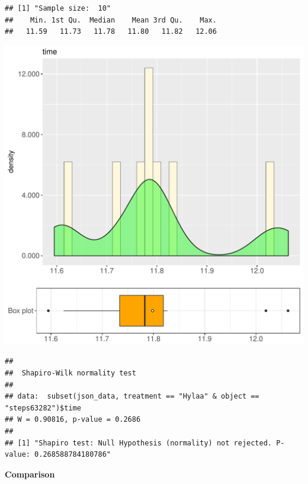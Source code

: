 \documentclass{article}\usepackage[]{graphicx}\usepackage[]{color}
\makeatletter
\def\maxwidth{ %
  \ifdim\Gin@nat@width>\linewidth
    \linewidth
  \else
    \Gin@nat@width
  \fi
}
\newenvironment{kframe}{%
 \def\at@end@of@kframe{}%
 \ifinner\ifhmode%
  \def\at@end@of@kframe{\end{minipage}}%
  \begin{minipage}{\columnwidth}%
 \fi\fi%
 \def\FrameCommand##1{\hskip\@totalleftmargin \hskip-\fboxsep
 \colorbox{shadecolor}{##1}\hskip-\fboxsep
     \hskip-\linewidth \hskip-\@totalleftmargin \hskip\columnwidth}%
 \MakeFramed {\advance\hsize-\width
   \@totalleftmargin\z@ \linewidth\hsize
   \@setminipage}}%
 {\par\unskip\endMakeFramed%
 \at@end@of@kframe}
\newenvironment{knitrout}{}{} %
\makeatother
\begin{document}
\begin{knitrout}
\color{fgcolor}\begin{kframe}
\begin{verbatim}
## [1] "Sample size:  10"
##    Min. 1st Qu.  Median    Mean 3rd Qu.    Max. 
##   11.59   11.73   11.78   11.80   11.82   12.06
\end{verbatim}
\end{kframe}
\includegraphics[width=\maxwidth]{figure/RH2_Hylaa_steps63282-1} 
\begin{kframe}\begin{verbatim}
## 
## 	Shapiro-Wilk normality test
## 
## data:  subset(json_data, treatment == "Hylaa" & object == "steps63282")$time
## W = 0.90816, p-value = 0.2686
## 
## [1] "Shapiro test: Null Hypothesis (normality) not rejected. P-value: 0.268588784180786"
\end{verbatim}
\end{kframe}
\end{knitrout}
  
 \textbf{Comparison}
  
\end{document}
